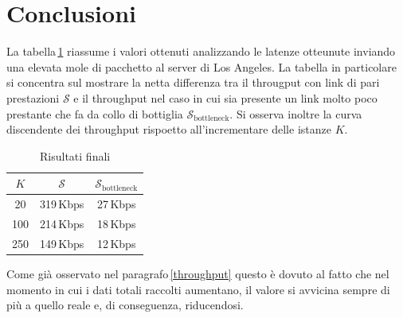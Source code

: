 \newpage\section{Conclusioni}
La tabella\,\ref{tab:summary} riassume i valori ottenuti analizzando le latenze otteunute inviando una elevata mole di pacchetto al server di Los Angeles. La tabella in particolare si concentra sul mostrare la netta differenza tra il througput con link di pari prestazioni $\mathcal{S}$ e il throughput nel caso in cui sia presente un link molto poco prestante che fa da collo di bottiglia $\mathcal{S}_{\text{bottleneck}}$. Si osserva inoltre la curva discendente dei throughput rispoetto all'incrementare delle istanze $K$.
\begin{table}[h]
    \centering
    \caption{Risultati finali}\vspace{5px}
    \renewcommand{\arraystretch}{1.5}
    \begin{tabular}{| c | c c |}
        \hline
        $K$ & $\mathcal{S}$ & $\mathcal{S}_{\text{bottleneck}}$ \\\hline\hline
        20  & 319\,Kbps & 27\,Kbps \\
        100 & 214\,Kbps & 18\,Kbps \\
        250 & 149\,Kbps & 12\,Kbps \\
        \hline
    \end{tabular}
    \renewcommand{\arraystretch}{1}
    \label{tab:summary}
\end{table}
Come già osservato nel paragrafo\,\ref{throughput} questo è dovuto al fatto che nel momento in cui i dati totali raccolti aumentano, il valore si avvicina sempre di più a quello reale e, di conseguenza, riducendosi. 


